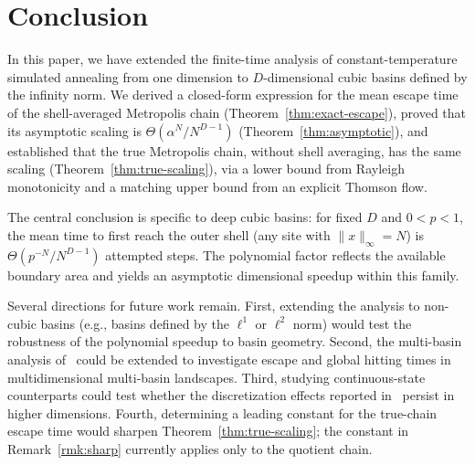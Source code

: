\documentclass[conference]{IEEEtran}
\DeclareRobustCommand{\revfouradd}[1]{{\color{revisiongreen}#1}}
\newcommand{\norm}[1]{\lVert #1\rVert}
\begin{document}





\section{Conclusion}

In this paper, we have extended the finite-time analysis of
constant-temperature simulated annealing from one dimension to
$D$-dimensional cubic basins defined by the infinity norm.
We derived a closed-form expression for the mean escape time of the
shell-averaged Metropolis chain (Theorem~\ref{thm:exact-escape}),
proved that its asymptotic scaling is $\Theta(\alpha^N/N^{D-1})$
(Theorem~\ref{thm:asymptotic}), and established that the true
Metropolis chain, without shell averaging, has the same scaling
(Theorem~\ref{thm:true-scaling}), via a lower bound from Rayleigh
monotonicity and a matching upper bound from an explicit Thomson flow.

The central conclusion is specific to deep cubic basins: for fixed
$D$ and $0<p<1$, the mean time to first reach the outer shell
(any site with $\norm{x}_\infty=N$) is
$\Theta(p^{-N}/N^{D-1})$ attempted steps. The polynomial factor reflects
the available boundary area and yields an asymptotic dimensional speedup
within this family. 

Several directions for future work remain.
First, extending the analysis to non-cubic basins (e.g., basins
defined by the $\ell^1$ or $\ell^2$ norm) would test the robustness
of the polynomial speedup to basin geometry.
Second, the multi-basin analysis of~\cite{ramachandran2026} could be
extended to investigate escape and global hitting times in
multidimensional multi-basin landscapes.
 Third, studying continuous-state counterparts could test whether the
discretization effects reported in~\cite{ramachandran2026} persist
in higher dimensions. Fourth, determining a leading constant for the true-chain escape time would sharpen Theorem~\ref{thm:true-scaling}; the constant in Remark~\ref{rmk:sharp} currently applies only to the quotient chain.
\end{document}
